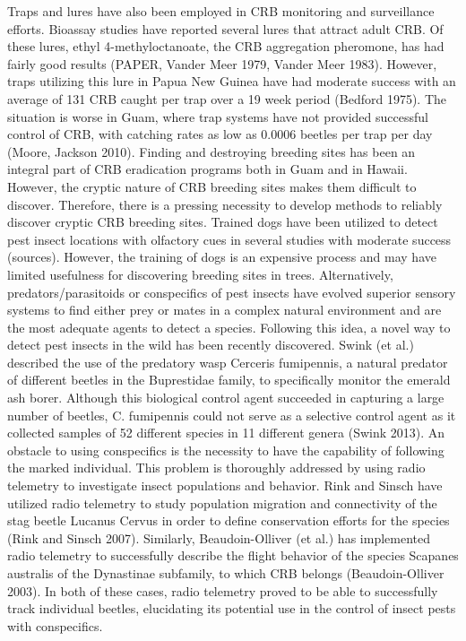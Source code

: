 \documentclass[11pt,letterpaper]{scrartcl}
\begin{document}
Traps and lures have also been employed in CRB monitoring and surveillance efforts. Bioassay studies have reported several lures that attract adult CRB. Of these lures, ethyl 4-methyloctanoate, the CRB aggregation pheromone, has had fairly good results (PAPER, Vander Meer 1979, Vander Meer 1983). However, traps utilizing this lure in Papua New Guinea have had moderate success with an average of 131 CRB caught per trap over a 19 week period (Bedford 1975). The situation is worse in Guam, where trap systems have not provided successful control of CRB, with catching rates as low as 0.0006 beetles per trap per day (Moore, Jackson 2010). 
Finding and destroying breeding sites has been an integral part of CRB eradication programs both in Guam and in Hawaii. However, the cryptic nature of CRB breeding sites makes them difficult to discover. Therefore, there is a pressing necessity to develop methods to reliably discover cryptic CRB breeding sites. Trained dogs have been utilized to detect pest insect locations with olfactory cues in several studies with moderate success (sources). However, the training of dogs is an expensive process and may have limited usefulness for discovering breeding sites in trees. Alternatively, predators/parasitoids or conspecifics of pest insects have evolved superior sensory systems to find either prey or mates in a complex natural environment and are the most adequate agents to detect a species. Following this idea, a novel way to detect pest insects in the wild has been recently discovered. Swink (et al.) described the use of the predatory wasp Cerceris fumipennis, a natural predator of different beetles in the Buprestidae family, to specifically monitor the emerald ash borer. Although this biological control agent succeeded in capturing a large number of beetles, C. fumipennis could not serve as a selective control agent as it collected samples of 52 different species in 11 different genera (Swink 2013). An obstacle to using conspecifics is the necessity to have the capability of following the marked individual. This problem is thoroughly addressed by using radio telemetry to investigate insect populations and behavior. Rink and Sinsch have utilized radio telemetry to study population migration and connectivity of the stag beetle Lucanus Cervus in order to define conservation efforts for the species (Rink and Sinsch 2007). Similarly, Beaudoin-Olliver (et al.) has implemented radio telemetry to successfully describe the flight behavior of the species Scapanes australis of the Dynastinae subfamily, to which CRB belongs (Beaudoin-Olliver 2003). In both of these cases, radio telemetry proved to be able to successfully track individual beetles, elucidating its potential use in the control of insect pests with conspecifics. 
\end{document}
